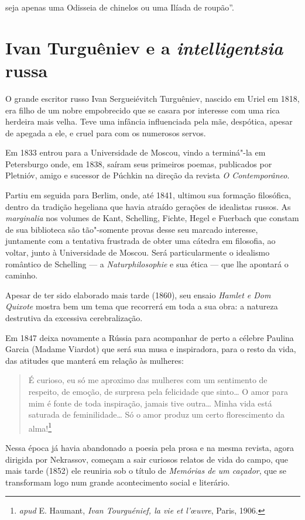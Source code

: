 seja apenas uma Odisseia de chinelos ou uma Ilíada de roupão''.

\chapter{Ivan Turguêniev e a \emph{intelligentsia} russa}


O grande escritor russo Ivan Sergueiévitch Turguêniev, nascido em Uriel em 1818, era filho de um nobre empobrecido que se casara por interesse com uma rica
herdeira mais velha. Teve uma infância influenciada pela mãe, despótica,
apesar de apegada a ele, e cruel para com os numerosos servos.

Em 1833 entrou para a Universidade de Moscou, vindo a terminá"-la em
Petersburgo onde, em 1838, saíram seus primeiros poemas, publicados por
Pletnióv, amigo e sucessor de Púchkin na direção da revista \emph{O
Contemporâneo}.

Partiu em seguida para Berlim, onde, até 1841, ultimou sua formação
filosófica, dentro da tradição hegeliana que havia atraído gerações de
idealistas russos. As \emph{marginalia} nos volumes de Kant, Schelling,
Fichte, Hegel e Fuerbach que constam de sua biblioteca são tão"-somente
provas desse seu marcado interesse, juntamente com a tentativa frustrada
de obter uma cátedra em filosofia, ao voltar, junto à Universidade de
Moscou. Será particularmente o idealismo romântico de Schelling --- a
\emph{Naturphilosophie} e sua ética --- que lhe apontará o caminho.

Apesar de ter sido elaborado mais tarde (1860), seu ensaio \emph{Hamlet e Dom
Quixote} mostra bem um tema que recorrerá em toda a sua obra: a natureza
destrutiva da excessiva cerebralização.

Em 1847 deixa novamente a Rússia para acompanhar de perto a célebre
Paulina Garcia (Madame Viardot) que será sua musa e inspiradora, para o
resto da vida, das atitudes que manterá em relação às mulheres:

\begin{quote}
É curioso, eu só me aproximo das mulheres com um sentimento de
respeito, de emoção, de surpresa pela felicidade que sinto\ldots{} O amor para
mim é fonte de toda inspiração, jamais tive outra\ldots{} Minha vida está
saturada de feminilidade\ldots{} Só o amor produz um certo florescimento da
alma!\footnote{\emph{apud} E. Haumant, \emph{Ivan Tourguénief, la vie et l'œuvre},
Paris, 1906.}
\end{quote}

Nessa época já havia abandonado a poesia pela prosa e na mesma revista,
agora dirigida por Nekrassov, começam a sair curiosos relatos de vida do
campo, que mais tarde (1852) ele reuniria sob o título de \emph{Memórias
de um caçador}, que se transformam logo num grande acontecimento social
e literário.

